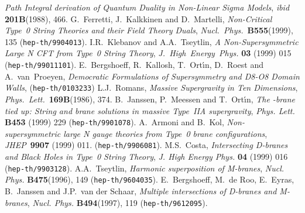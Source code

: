 \documentclass[12pt,a4paper]{article}
\begin{document}
\begin{thebibliography}{99}
          {\sl Path Integral derivation of Quantum Duality in
                Non-Linear Sigma Models},
                {\it ibid} {\bf 201B}(1988), 466.
%
 G.~Ferretti, J.~Kalkkinen and D.~Martelli,
                 {\sl Non-Critical Type~0 String Theories and 
                 their Field Theory Duals},
                 {\it Nucl.~Phys.}~{\bf B555}(1999), 135
                ({\tt hep-th/9904013}).
%
 I.R.~Klebanov and A.A.~Tseytlin,
        {\sl A Non-Supersymmetric Large N CFT from 
             Type~0 String Theory},
        {\it J.~High~Energy~Phys.} {\bf 03} (1999) 015
        ({\tt hep-th/99011101}).
%
 E.~Bergshoeff, R.~Kallosh, T.~Ort\'{\i}n,
                               D.~Roest and A.~van~Proeyen,
     {\sl Democratic Formulations of \coordHE{} Supersymmetry and 
          D8-O8 Domain Walls},
      ({\tt hep-th/0103233})              
%
 L.J.~Romans,
          {\sl Massive \coordHE{} Supergravity in Ten Dimensions},
                 {\it Phys.~Lett.}~{\bf 169B}(1986), 374.
%
 B.~Janssen, P.~Meessen and T.~Ort\'{\i}n,
        {\sl The \coordHE{}-brane tied up: String and brane
              solutions in massive Type~IIA supergravity},
        {\it Phys. Lett.} {\bf B453} (1999) 229
        ({\tt hep-th/9901078}). 
%
 A.~Armoni and B.~Kol,
                        {\sl Non-supersymmetric large N gauge theories from 
                        Type~0 brane  configurations},
                        {\it JHEP}~{\bf 9907} (1999) 011.
                        ({\tt hep-th/9906081}).
%
 M.S.~Costa,
        {\sl Intersecting D-branes and Black Holes in 
             Type~0 String Theory},
        {\it J. High Energy Phys.} {\bf 04} (1999) 016
        ({\tt hep-th/9903128}).
%
 A.A.~Tseytlin,
        {\sl Harmonic superposition of M-branes},
        {\it Nucl. Phys.} {\bf B475}(1996), 149
        ({\tt hep-th/9604035}).
%
 E.~Bergshoeff, M.~de Roo, E.~Eyras, B.~Janssen and 
                     J.P.~van der Schaar,
        {\sl Multiple intersections of D-branes and M-branes},
        {\it Nucl. Phys.} {\bf B494}(1997), 119
        ({\tt hep-th/9612095}).

\end{thebibliography}
%
%
\end{document}
